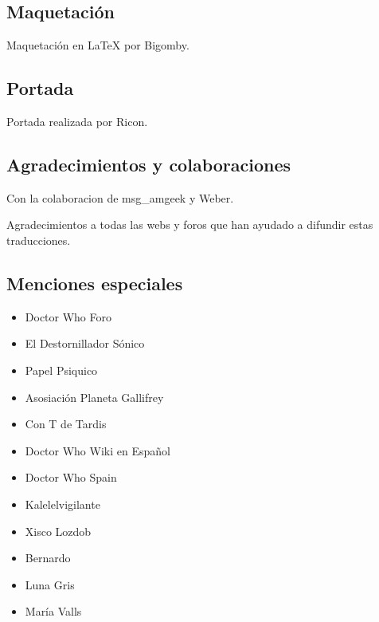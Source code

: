 \begin{multicols}{2}
\subsection*{Maquetación}\label{maquetaciuxf3n}

Maquetación en LaTeX por Bigomby.

\subsection*{Portada}\label{portada}

Portada realizada por Ricon.

\subsection*{Agradecimientos y
colaboraciones}\label{agradecimientos-y-colaboraciones}

Con la colaboracion de msg\_amgeek y Weber.

Agradecimientos a todas las webs y foros que han ayudado a difundir
estas traducciones.

\subsection*{Menciones especiales}\label{menciones-especiales}

\begin{itemize}
\itemsep1pt\parskip0pt
\item
  Doctor Who Foro
\item
  El Destornillador Sónico
\item
  Papel Psiquico
\item
  Asosiación Planeta Gallifrey
\item
  Con T de Tardis
\item
  Doctor Who Wiki en Español
\item
  Doctor Who Spain
\item
  Kalelelvigilante
\item
  Xisco Lozdob
\item
  Bernardo
\item
  Luna Gris
\item
  María Valls
\end{itemize}

\end{multicols}
\endgroup